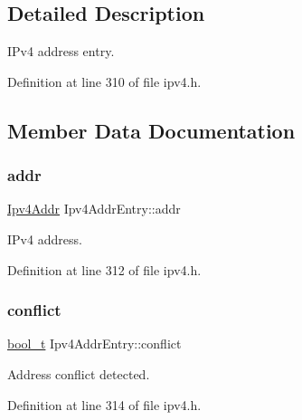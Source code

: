 \subsection{Detailed Description}
I\+Pv4 address entry. 

Definition at line 310 of file ipv4.\+h.



\subsection{Member Data Documentation}
\mbox{\label{structIpv4AddrEntry_a63f7b289c827b77a86f2824468b74fbf}} 
\subsubsection{\texorpdfstring{addr}{addr}}
{\footnotesize\ttfamily \hyperlink{ipv4_8h_a411debb3d770caa0c06d3f73367da37f}{Ipv4\+Addr} Ipv4\+Addr\+Entry\+::addr}



I\+Pv4 address. 



Definition at line 312 of file ipv4.\+h.

\mbox{\label{structIpv4AddrEntry_a99a82bf5609db4f21877d2e62a69972a}} 
\subsubsection{\texorpdfstring{conflict}{conflict}}
{\footnotesize\ttfamily \hyperlink{compiler__port_8h_a812d16e5494522586b3784e55d479912}{bool\+\_\+t} Ipv4\+Addr\+Entry\+::conflict}



Address conflict detected. 



Definition at line 314 of file ipv4.\+h.

\mbox{\label{structIpv4AddrEntry_a6412d2664b448d636ce53d4edc71366c}} 
